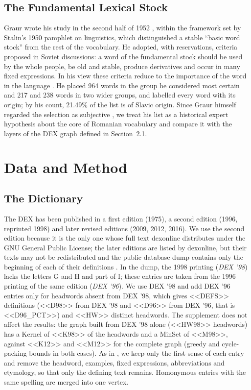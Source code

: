\documentclass[11pt]{article}
\newcommand{\ro}[1]{\textit{#1}}
\begin{document}
\subsection{The Fundamental Lexical Stock}
Graur wrote his study in the second half of 1952 \cite{graur1957}, within the framework set by Stalin's 1950 pamphlet on linguistics, which distinguished a stable ``basic word stock'' from the rest of the vocabulary. He adopted, with reservations, criteria proposed in Soviet discussions: a word of the fundamental stock should be used by the whole people, be old and stable, produce derivatives and occur in many fixed expressions. In his view these criteria reduce to the importance of the word in the language \cite{graur1954}. He placed 964 words in the group he considered most certain and 217 and 238 words in two wider groups, and labelled every word with its origin; by his count, 21.49\% of the list is of Slavic origin. Since Graur himself regarded the selection as subjective \cite{graur1957}, we treat his list as a historical expert hypothesis about the core of Romanian vocabulary and compare it with the layers of the DEX graph defined in Section~2.1.

\section{Data and Method}
\subsection{The Dictionary}
The DEX has been published in a first edition (1975), a second edition (1996, reprinted 1998) and later revised editions (2009, 2012, 2016). We use the second edition because it is the only one whose full text dexonline distributes under the GNU General Public License; the later editions are listed by dexonline, but their texts may not be redistributed and the public database dump contains only the beginning of each of their definitions \cite{dexonline_sources}. In the dump, the 1998 printing (\ro{DEX '98}) lacks the letters G and H and part of I; these entries are taken from the 1996 printing of the same edition (\ro{DEX '96}). We use DEX '98 and add DEX '96 entries only for headwords absent from DEX '98, which gives <<DEFS>> definitions (<<D98>> from DEX '98 and <<D96>> from DEX '96, that is <<D96_PCT>>) and <<HW>> distinct headwords. The supplement does not affect the results: the graph built from DEX '98 alone (<<HW98>> headwords) has a Kernel of <<K98>> of the headwords and a MinSet of <<M98>>, against <<K12>> and <<M12>> for the complete graph (greedy and cycle-packing bounds in both cases). As in , we keep only the first sense of each entry and remove the headword, examples, fixed expressions, abbreviations and etymology, so that only the defining text remains. Homonymous entries with the same spelling are merged into one vertex.
\end{document}
